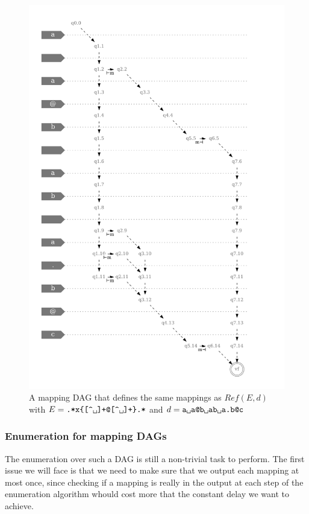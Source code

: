 \documentclass[12px]{article}
\theoremstyle{definition}
\begin{document}
        \begin{figure}
          \caption{%
            A mapping DAG that defines the same mappings as $Ref(E, d)$ with $E
            =
            \texttt{.*x\{[\textasciicircum\textvisiblespace]+@[\textasciicircum\textvisiblespace]+\}.*}$
            and $d =
            \texttt{a{\textvisiblespace}a@b{\textvisiblespace}ab{\textvisiblespace}a.b@c}$
          }
          \center\includegraphics[width=5in]{figures/example_dag}
        \end{figure}

      \subsubsection{Enumeration for mapping DAGs}

        The enumeration over such a DAG is still a non-trivial task to perform.
        The first issue we will face is that we need to make sure that we
        output each mapping at most once, since checking if a mapping is really
        in the output at each step of the enumeration algorithm whould cost
        more that the constant delay we want to achieve.
\end{document}
